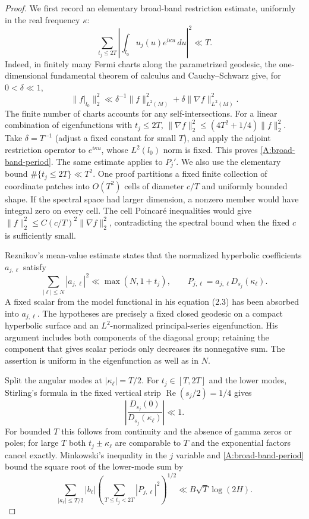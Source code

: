 \begin{proof}
We first record an elementary broad-band restriction estimate, uniformly
in the real frequency $\kappa$:
\begin{equation}\label{A:broad-band-period}
 \sum_{t_j\leq2T}\left|\int_{l_0}u_j(u)e^{i\kappa u}\,du\right|^2
       \ll T.
\end{equation}
Indeed, in finitely many Fermi charts along the parametrized geodesic,
the one-dimensional fundamental theorem of calculus and Cauchy--Schwarz
give, for $0<\delta\ll1$,
\[
 \|f|_{l_0}\|_2^2\ll
 \delta^{-1}\|f\|_{L^2(M)}^2+
 \delta\|\nabla f\|_{L^2(M)}^2.
\]
The finite number of charts accounts for any self-intersections.
For a linear combination of eigenfunctions with $t_j\leq2T$,
$\|\nabla f\|_2^2\leq(4T^2+1/4)\|f\|_2^2$.
Take $\delta=T^{-1}$ (adjust a fixed constant for small $T$), and
apply the adjoint restriction operator to $e^{i\kappa u}$, whose
$L^2(l_0)$ norm is fixed. This proves \eqref{A:broad-band-period}.
The same estimate applies to $P_j'$.
We also use the elementary bound $\#\{t_j\leq2T\}\ll T^2$.
One proof partitions a fixed finite collection of coordinate patches
into $O(T^2)$ cells of diameter $c/T$ and uniformly bounded shape.
If the spectral space had larger dimension, a nonzero member would
have integral zero on every cell. The cell Poincar\'e inequalities would
give $\|f\|_2^2\leq C(c/T)^2\|\nabla f\|_2^2$, contradicting the
spectral bound when the fixed $c$ is sufficiently small.

Reznikov's mean-value estimate
\cite[equation (1.13), proved in Sections 2.3 and 3.1--3.2]{Reznikov2015}
states that the normalized hyperbolic coefficients $a_{j,\ell}$ satisfy
\begin{equation}\label{A:Reznikov-mean}
 \sum_{|\ell|\leq N}|a_{j,\ell}|^2\ll\max(N,1+t_j),
 \qquad P_{j,\ell}=a_{j,\ell}D_{s_j}(\kappa_\ell).
\end{equation}
A fixed scalar from the model functional in his equation (2.3) has
been absorbed into $a_{j,\ell}$. The hypotheses are precisely a fixed
closed geodesic on a compact hyperbolic surface and an $L^2$-normalized
principal-series eigenfunction. His argument includes both components
of the diagonal group; retaining the component that gives scalar
periods only decreases its nonnegative sum. The assertion is uniform
in the eigenfunction as well as in $N$.

Split the angular modes at $|\kappa_\ell|=T/2$.
For $t_j\in[T,2T]$ and the lower modes, Stirling's formula in the
fixed vertical strip $\operatorname{Re}(s_j/2)=1/4$ gives
\[
 \left|\frac{D_{s_j}(0)}{D_{s_j}(\kappa_\ell)}\right|\ll1.
\]
For bounded $T$ this follows from continuity and the absence of gamma
zeros or poles; for large $T$ both $t_j\pm\kappa_\ell$ are comparable
to $T$ and the exponential factors cancel exactly.
Minkowski's inequality in the $j$ variable and
\eqref{A:broad-band-period} bound the square root of the lower-mode
sum by
\[
 \sum_{|\kappa_\ell|\leq T/2}|b_\ell|
 \left(\sum_{T\leq t_j<2T}|P_{j,\ell}|^2\right)^{1/2}
       \ll B\sqrt T\log(2H).
\]


\end{proof}
